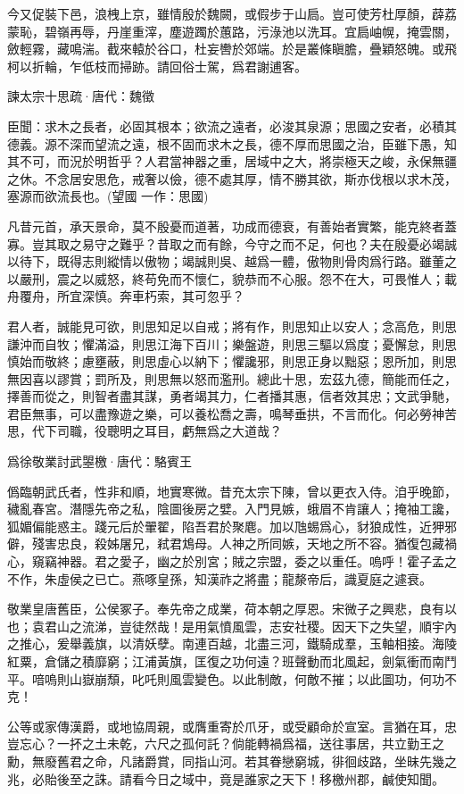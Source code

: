 \documentclass[12pt,a4paper]{ctexbook}
\begin{document}
今又促裝下邑，浪栧上京，雖情殷於魏闕，或假步于山扃。豈可使芳杜厚顏，薜荔蒙恥，碧嶺再辱，丹崖重滓，塵遊躅於蕙路，污淥池以洗耳。宜扃岫幌，掩雲關，斂輕霧，藏鳴湍。截來轅於谷口，杜妄轡於郊端。於是叢條瞋膽，疊穎怒魄。或飛柯以折輪，乍低枝而掃跡。請回俗士駕，爲君謝逋客。\par
諫太宗十思疏·唐代：魏徵 \par
臣聞：求木之長者，必固其根本；欲流之遠者，必浚其泉源；思國之安者，必積其德義。源不深而望流之遠，根不固而求木之長，德不厚而思國之治，臣雖下愚，知其不可，而況於明哲乎？人君當神器之重，居域中之大，將崇極天之峻，永保無疆之休。不念居安思危，戒奢以儉，德不處其厚，情不勝其欲，斯亦伐根以求木茂，塞源而欲流長也。(望國 一作：思國)\par
凡昔元首，承天景命，莫不殷憂而道著，功成而德衰，有善始者實繁，能克終者蓋寡。豈其取之易守之難乎？昔取之而有餘，今守之而不足，何也？夫在殷憂必竭誠以待下，既得志則縱情以傲物；竭誠則吳、越爲一體，傲物則骨肉爲行路。雖董之以嚴刑，震之以威怒，終苟免而不懷仁，貌恭而不心服。怨不在大，可畏惟人；載舟覆舟，所宜深慎。奔車朽索，其可忽乎？\par
君人者，誠能見可欲，則思知足以自戒；將有作，則思知止以安人；念高危，則思謙沖而自牧；懼滿溢，則思江海下百川；樂盤遊，則思三驅以爲度；憂懈怠，則思慎始而敬終；慮壅蔽，則思虛心以納下；懼讒邪，則思正身以黜惡；恩所加，則思無因喜以謬賞；罰所及，則思無以怒而濫刑。總此十思，宏茲九德，簡能而任之，擇善而從之，則智者盡其謀，勇者竭其力，仁者播其惠，信者效其忠；文武爭馳，君臣無事，可以盡豫遊之樂，可以養松喬之壽，鳴琴垂拱，不言而化。何必勞神苦思，代下司職，役聰明之耳目，虧無爲之大道哉？\par
爲徐敬業討武曌檄·唐代：駱賓王 \par
僞臨朝武氏者，性非和順，地實寒微。昔充太宗下陳，曾以更衣入侍。洎乎晚節，穢亂春宮。潛隱先帝之私，陰圖後房之嬖。入門見嫉，蛾眉不肯讓人；掩袖工讒，狐媚偏能惑主。踐元后於翬翟，陷吾君於聚麀。加以虺蜴爲心，豺狼成性，近狎邪僻，殘害忠良，殺姊屠兄，弒君鴆母。人神之所同嫉，天地之所不容。猶復包藏禍心，窺竊神器。君之愛子，幽之於別宮；賊之宗盟，委之以重任。嗚呼！霍子孟之不作，朱虛侯之已亡。燕啄皇孫，知漢祚之將盡；龍漦帝后，識夏庭之遽衰。\par
敬業皇唐舊臣，公侯冢子。奉先帝之成業，荷本朝之厚恩。宋微子之興悲，良有以也；袁君山之流涕，豈徒然哉！是用氣憤風雲，志安社稷。因天下之失望，順宇內之推心，爰舉義旗，以清妖孽。南連百越，北盡三河，鐵騎成羣，玉軸相接。海陵紅粟，倉儲之積靡窮；江浦黃旗，匡復之功何遠？班聲動而北風起，劍氣衝而南鬥平。喑嗚則山嶽崩頹，叱吒則風雲變色。以此制敵，何敵不摧；以此圖功，何功不克！\par
公等或家傳漢爵，或地協周親，或膺重寄於爪牙，或受顧命於宣室。言猶在耳，忠豈忘心？一抔之土未乾，六尺之孤何託？倘能轉禍爲福，送往事居，共立勤王之勳，無廢舊君之命，凡諸爵賞，同指山河。若其眷戀窮城，徘徊歧路，坐昧先幾之兆，必貽後至之誅。請看今日之域中，竟是誰家之天下！移檄州郡，鹹使知聞。\par
\end{document}
